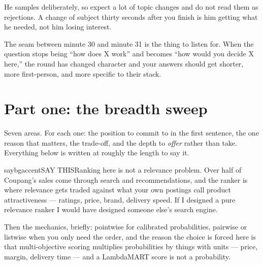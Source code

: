 \documentclass[10pt,twoside]{book}
\makeatletter
\newcommand{\cchapter}[1]{\chapter{#1}}
\newcommand{\csection}[1]{\par\vspace{13pt}\noindent{\sffamily\large\bfseries\color{ink}\raggedright #1\par}\vspace{4pt}}
\newenvironment{calloutsay}{\begin{co@box}{saybg}{accent}{SAY THIS}}{\end{co@box}}
\makeatother
\begin{document}
\csection{The shape of the hour}
He samples deliberately, so expect a lot of topic changes and do not read them as rejections. A change of subject thirty seconds after you finish is him getting what he needed, not him losing interest.\par
\par{}\par\medskip
The seam between minute 30 and minute 31 is the thing to listen for. When the question stops being ``how does X work'' and becomes ``how would you decide X here,'' the round has changed character and your answers should get shorter, more first-person, and more specific to their stack.\par
\cchapter{Part one: the breadth sweep}
Seven areas. For each one: the position to commit to in the first sentence, the one reason that matters, the trade-off, and the depth to \textit{offer} rather than take. Everything below is written at roughly the length to say it.\par
\csection{Ranking}
\begin{calloutsay}Ranking here is not a relevance problem. Over half of Coupang's sales come through search and recommendations, and the ranker is where relevance gets traded against what your own postings call product attractiveness --- ratings, price, brand, delivery speed. If I designed a pure relevance ranker I would have designed someone else's search engine.\end{calloutsay}
Then the mechanics, briefly: pointwise for calibrated probabilities, pairwise or listwise when you only need the order, and the reason the choice is forced here is that multi-objective scoring multiplies probabilities by things with units --- price, margin, delivery time --- and a LambdaMART score is not a probability.\par
\end{document}
